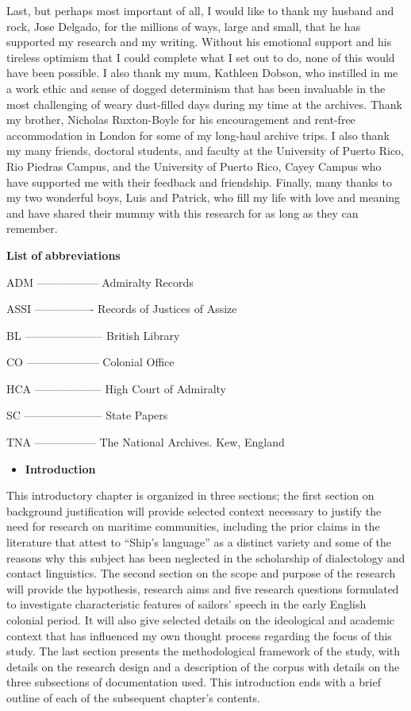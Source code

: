 Last, but perhaps most important of all, I would like to thank my husband and rock, Jose Delgado, for the millions of ways, large and small, that he has supported my research and my writing.  Without his emotional support and his tireless optimism that I could complete what I set out to do, none of this would have been possible. I also thank my mum, Kathleen Dobson, who instilled in me a work ethic and sense of dogged determinism that has been invaluable in the most challenging of weary dust-filled days during my time at the archives. Thank my brother, Nicholas Ruxton-Boyle for his encouragement and rent-free accommodation in London for some of my long-haul archive trips. I also thank my many friends, doctoral students, and faculty at the University of Puerto Rico, Rio Piedras Campus, and the University of Puerto Rico, Cayey Campus who have supported me with their feedback and friendship. Finally, many thanks to my two wonderful boys, Luis and Patrick, who fill my life with love and meaning and have shared their mummy with this research for as long as they can remember. 

\textbf{List} \textbf{of} \textbf{abbreviations}

ADM -----------------  Admiralty Records

ASSI ----------------  Records of Justices of Assize

BL ---------------------  British Library

CO --------------------  Colonial Office

HCA ------------------  High Court of Admiralty

SC ---------------------  State Papers

TNA -----------------  The National Archives. Kew, England

\begin{itemize}
\item \textbf{Introduction}
\end{itemize}

This introductory chapter is organized in three sections; the first section on background justification will provide selected context necessary to justify the need for research on maritime communities, including the prior claims in the literature that attest to “Ship’s language” as a distinct variety and some of the reasons why this subject has been neglected in the scholarship of dialectology and contact linguistics. The second section on the scope and purpose of the research will provide the hypothesis, research aims and five research questions formulated to investigate characteristic features of sailors’ speech in the early English colonial period. It will also give selected details on the ideological and academic context that has influenced my own thought process regarding the focus of this study. The last section presents the methodological framework of the study, with details on the research design and a description of the corpus with details on the three subsections of documentation used. This introduction ends with a brief outline of each of the subsequent chapter’s contents.



